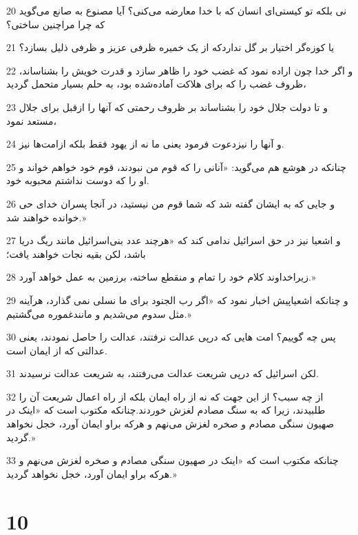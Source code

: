 \par 20 نی بلکه تو کیستی‌ای انسان که با خدا معارضه می‌کنی؟ آیا مصنوع به صانع می‌گوید که چرا مراچنین ساختی؟
\par 21 یا کوزه‌گر اختیار بر گل نداردکه از یک خمیره ظرفی عزیز و ظرفی ذلیل بسازد؟
\par 22 و اگر خدا چون اراده نمود که غضب خود را ظاهر سازد و قدرت خویش را بشناساند، ظروف غضب را که برای هلاکت آماده‌شده بود، به حلم بسیار متحمل گردید،
\par 23 و تا دولت جلال خود را بشناساند بر ظروف رحمتی که آنها را ازقبل برای جلال مستعد نمود،
\par 24 و آنها را نیزدعوت فرمود یعنی ما نه از یهود فقط بلکه ازامت‌ها نیز.
\par 25 چنانکه در هوشع هم می‌گوید: «آنانی را که قوم من نبودند، قوم خود خواهم خواند و او را که دوست نداشتم محبوبه خود.
\par 26 و جایی که به ایشان گفته شد که شما قوم من نیستید، در آنجا پسران خدای حی خوانده خواهند شد.»
\par 27 و اشعیا نیز در حق اسرائیل ندامی کند که «هرچند عدد بنی‌اسرائیل مانند ریگ دریا باشد، لکن بقیه نجات خواهند یافت؛
\par 28 زیراخداوند کلام خود را تمام و منقطع ساخته، برزمین به عمل خواهد آورد.»
\par 29 و چنانکه اشعیاپیش اخبار نمود که «اگر رب الجنود برای ما نسلی نمی گذارد، هرآینه مثل سدوم می‌شدیم و مانندغموره می‌گشتیم.»
\par 30 پس چه گوییم؟ امت هایی که در‌پی عدالت نرفتند، عدالت را حاصل نمودند، یعنی عدالتی که از ایمان است.
\par 31 لکن اسرائیل که در‌پی شریعت عدالت می‌رفتند، به شریعت عدالت نرسیدند.
\par 32 از چه سبب؟ از این جهت که نه از راه ایمان بلکه از راه اعمال شریعت آن را طلبیدند، زیرا که به سنگ مصادم لغزش خوردند.چنانکه مکتوب است که «اینک در صهیون سنگی مصادم و صخره لغزش می‌نهم و هر‌که براو ایمان آورد، خجل نخواهد گردید.»
\par 33 چنانکه مکتوب است که «اینک در صهیون سنگی مصادم و صخره لغزش می‌نهم و هر‌که براو ایمان آورد، خجل نخواهد گردید.»

\chapter{10}

